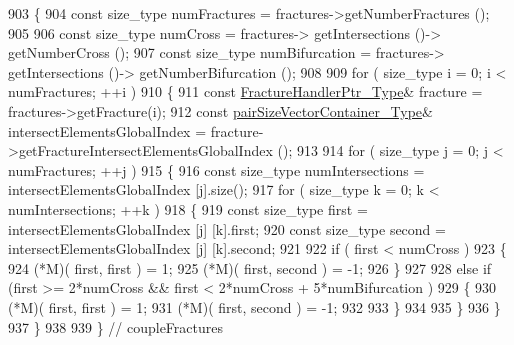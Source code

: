 \begin{DoxyCode}
903 \{
904     \textcolor{keyword}{const} size\_type numFractures = fractures->getNumberFractures ();
905     
906     \textcolor{keyword}{const} size\_type numCross = fractures-> getIntersections ()-> getNumberCross ();
907     \textcolor{keyword}{const} size\_type numBifurcation = fractures-> getIntersections ()-> getNumberBifurcation ();
908 
909     \textcolor{keywordflow}{for} ( size\_type i = 0; i < numFractures; ++i )
910     \{
911         \textcolor{keyword}{const} \hyperlink{FractureHandler_8h_af23fb7a30aaff864bd42587af4f1e78a}{FractureHandlerPtr\_Type}& fracture = fractures->getFracture(i);
912         \textcolor{keyword}{const} \hyperlink{Core_8h_a9bc476e433f99b82a9c2b8560735c7b5}{pairSizeVectorContainer\_Type}& intersectElementsGlobalIndex = 
      fracture->getFractureIntersectElementsGlobalIndex ();
913 
914         \textcolor{keywordflow}{for} ( size\_type j = 0; j < numFractures; ++j )
915         \{
916             \textcolor{keyword}{const} size\_type numIntersections = intersectElementsGlobalIndex [j].size();
917             \textcolor{keywordflow}{for} ( size\_type k = 0; k < numIntersections; ++k )
918             \{
919                 \textcolor{keyword}{const} size\_type first = intersectElementsGlobalIndex [j] [k].first;
920                 \textcolor{keyword}{const} size\_type second = intersectElementsGlobalIndex [j] [k].second;
921                 
922                 \textcolor{keywordflow}{if} ( first < numCross )
923                 \{
924                     (*M)( first, first ) = 1;
925                     (*M)( first, second ) = -1;
926                 \}
927                 
928                 \textcolor{keywordflow}{else} \textcolor{keywordflow}{if} (first >= 2*numCross && first < 2*numCross + 5*numBifurcation )
929                 \{
930                     (*M)( first, first ) = 1;
931                     (*M)( first, second ) = -1;
932                     
933                 \}
934                 
935             \}
936         \}
937     \}
938 
939 \} \textcolor{comment}{// coupleFractures}
\end{DoxyCode}
